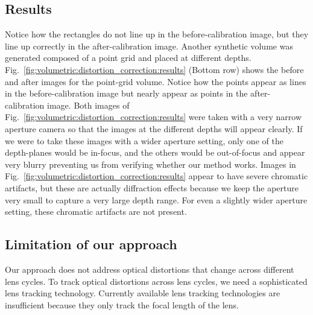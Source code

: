 \subsection{Results}
Notice how the rectangles do not line up in the before-calibration image, but they line up correctly in the after-calibration image. 
Another synthetic volume was generated composed of a point grid and placed at different depths. 
Fig.~\ref{fig:volumetric:distortion_correction:results} (Bottom row) shows the before and after images for the point-grid volume.
Notice how the points appear as lines in the before-calibration image but nearly appear as points in the after-calibration image.
Both images of Fig.~\ref{fig:volumetric:distortion_correction:results} were taken with a very narrow aperture camera so that the images at the different depths will appear clearly.
If we were to take these images with a wider aperture setting, only one of the depth-planes would be in-focus, and the others would be out-of-focus and appear very blurry preventing us from verifying whether our method works.
Images in Fig.~\ref{fig:volumetric:distortion_correction:results} appear to have severe chromatic artifacts, but these are actually diffraction effects because we keep the aperture very small to capture a very large depth range. For even a slightly wider aperture setting, these chromatic artifacts are not present. 

\subsection{Limitation of our approach}
Our approach does not address optical distortions that change across different lens cycles. To track optical distortions across lens cycles, we need a sophisticated lens tracking technology. Currently available lens tracking technologies are insufficient because they only track the focal length of the lens.

